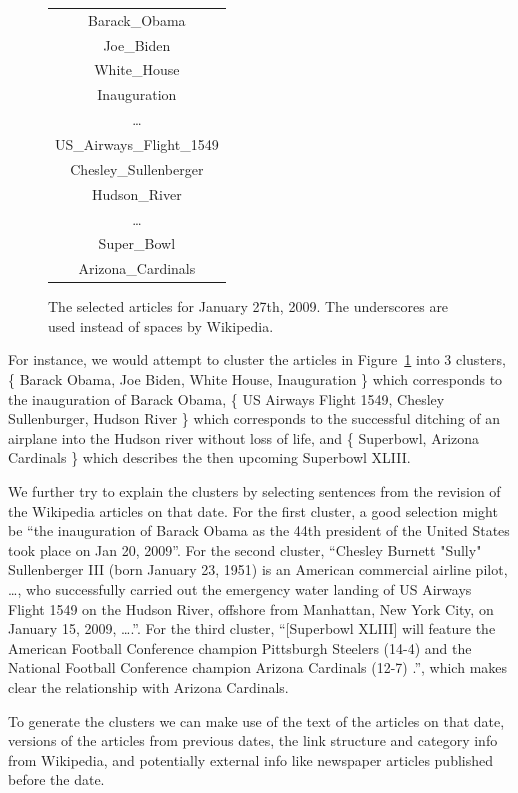\documentclass[11pt]{article}
\begin{document}
\begin{figure}
\centering
\begin{tabular}{|c|}
\hline
Barack\_Obama \\
Joe\_Biden \\
White\_House \\
Inauguration \\
\dots \\
US\_Airways\_Flight\_1549 \\
Chesley\_Sullenberger \\
Hudson\_River \\
\dots \\
Super\_Bowl \\
Arizona\_Cardinals \\
\hline
\end{tabular}
\caption{The selected articles for January 27th, 2009. The underscores are used instead of spaces by Wikipedia.}
\label{fig:topics-jan-27}
\end{figure}

For instance, we would attempt to cluster the articles in Figure~\ref{fig:topics-jan-27} into 3 clusters, \{ Barack Obama, Joe Biden, White House, Inauguration \} which corresponds to the inauguration of Barack Obama, \{ US Airways Flight 1549, Chesley Sullenburger, Hudson River \} which corresponds to the successful ditching of an airplane into the Hudson river without loss of life, and \{ Superbowl, Arizona Cardinals \} which describes the then upcoming Superbowl XLIII.

We further try to explain the clusters by selecting sentences from the revision of the Wikipedia articles on that date. For the first cluster, a good selection might be ``the inauguration of Barack Obama as the 44th president of the United States took place on Jan 20, 2009''. For the second cluster, ``Chesley Burnett "Sully" Sullenberger III (born January 23, 1951)  is an American commercial airline pilot, \ldots, who successfully carried out the emergency water landing of US Airways Flight 1549 on the Hudson River, offshore from Manhattan, New York City, on January 15, 2009, \ldots.''. For the third cluster, ``[Superbowl XLIII] will feature the American Football Conference champion Pittsburgh Steelers (14-4) and the National Football Conference champion Arizona Cardinals (12-7) .'', which makes clear the relationship with Arizona Cardinals.

To generate the clusters we can make use of the text of the articles on that date, versions of the articles from previous dates, the link structure and category info from Wikipedia, and potentially external info like newspaper articles published before the date.
\end{document}
